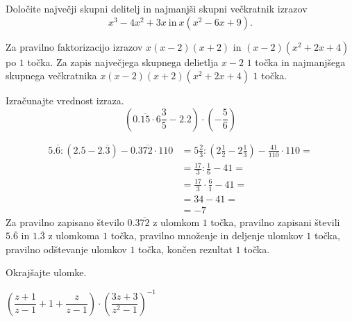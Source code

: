 \documentclass[addpoints,12pt]{exam}
\begin{document}
\begin{questions}



    \question[4]
    Določite največji skupni delitelj in najmanjši skupni večkratnik izrazov $$x^3-4x^2+3x \ \text{in}\ x(x^2-6x+9).$$

    \begin{solution}[7cm]
        Za pravilno faktorizacijo izrazov $x(x-2)(x+2)$ in $(x-2)(x^2+2x+4)$ po $1$ točka. 
        Za zapis največjega skupnega delietlja $x-2$ $1$ točka in najmanjšega skupnega večkratnika $x(x-2)(x+2)(x^2+2x+4)$ $1$ točka.
    \end{solution}
    

    

    \question[4]
    Izračunajte vrednost izraza.
        $$\left(0.\overline{15}\cdot 6\frac{3}{5}-2.2\right)\cdot\left(-\frac{5}{6}\right) $$

        \begin{solution}[4cm]
            \begin{align*}
                5.\overline{6}:(2.5-2.\overline{3}) - 0.3\overline{72}\cdot 110&=5\frac{2}{3}:(2\frac{1}{2}-2\frac{1}{3})- \frac{41}{110}\cdot 110 = \\
                                                                            &=\frac{17}{3}:\frac{1}{6}-41= \\
                                                                            &=\frac{17}{3}\cdot \frac{6}{1}-41= \\
                                                                            &=34-41= \\
                                                                            &= -7
            \end{align*}
            Za pravilno zapisano število $0.3\overline{72}$ z ulomkom $1$ točka, pravilno zapisani števili $5.\overline{6}$ in $1.\overline{3}$ z ulomkoma $1$ točka, pravilno množenje in deljenje ulomkov $1$ točka, pravilno odštevanje ulomkov $1$ točka, končen rezultat $1$ točka.
        \end{solution}




    \newpage

    \question[4]
    Okrajšajte ulomke.
        

        $\left(\dfrac{z+1}{z-1}+1+\dfrac{z}{z-1}\right)\cdot\left(\dfrac{3z+3}{z^2-1}\right)^{-1}$


\end{questions}
\end{document}
